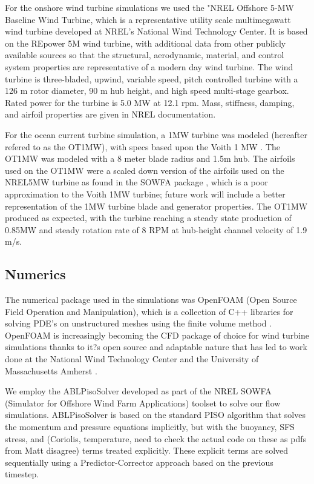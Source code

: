For the onshore wind turbine simulations we used the "NREL Offshore 5-MW Baseline Wind Turbine\cite{jonkman_definition_2009}, which is a representative utility scale multimegawatt wind turbine developed at NREL's National Wind Technology Center.  It is based on the REpower 5M wind turbine, with additional data from other publicly available sources so that the structural, aerodynamic, material, and control system properties are representative of a modern day wind turbine.  The wind turbine is three-bladed, upwind, variable speed, pitch controlled turbine with a 126 m rotor diameter, 90 m hub height, and high speed multi-stage gearbox.  Rated power for the turbine is 5.0 MW at 12.1 rpm.  Mass, stiffness, damping, and airfoil properties are given in NREL documentation\cite{jonkman_definition_2009}.

For the ocean current turbine simulation, a 1MW turbine was modeled (hereafter refered to as the OT1MW), with specs based upon the Voith 1 MW \cite{Voith}. The OT1MW was modeled with a 8 meter blade radius and 1.5m hub. The airfoils used on the OT1MW were a scaled down version of the airfoils used on the NREL5MW turbine as found in the SOWFA package \cite{SOWFA}, which is a poor approximation to the Voith 1MW turbine; future work will include a better representation of the 1MW turbine blade and generator properties. The OT1MW produced as expected, with the turbine reaching a steady state production of 0.85MW and steady rotation rate of 8 RPM at hub-height channel velocity of 1.9 m/s.



\subsection{Numerics}


The numerical package used in the simulations was OpenFOAM (Open Source Field Operation and Manipulation), which is a collection of C++ libraries for solving PDE's on unstructured meshes using the finite volume method \cite{OpenFOAM}. OpenFOAM is increasingly becoming the CFD package of choice for wind turbine simulations thanks to it?s open source and adaptable nature that has led to work done at the National Wind Technology Center and the University of Massachusetts Amherst \cite{}.  

We employ the ABLPisoSolver developed as part of the NREL SOWFA (Simulator for Offshore Wind Farm Applications) toolset \cite{SOWFA} to solve our flow simulations.  ABLPisoSolver is based on the standard PISO algorithm that solves the momentum and pressure equations implicitly, but with the buoyancy, SFS stress, and (Coriolis, temperature, need to check the actual code on these as pdfs from Matt disagree) terms treated explicitly.  These explicit terms are solved sequentially using a Predictor-Corrector approach based on the previous timestep.  

